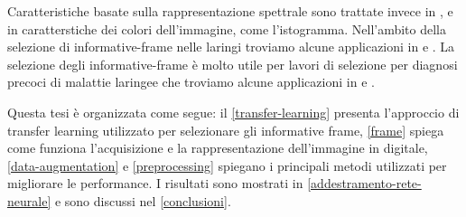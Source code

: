 Caratteristiche basate sulla rappresentazione spettrale sono trattate invece in \citeauthor{atasoy_endoscopic} \cite{atasoy_endoscopic}, \citeauthor{haji_wce} \cite{haji_wce} e in \citeauthor{bashar_endoscopy} \cite{bashar_endoscopy} caratterstiche dei colori dell'immagine, come l'istogramma. Nell'ambito della selezione di informative-frame nelle laringi  troviamo alcune applicazioni in \citeauthor{moccia_workflow} \cite{moccia_workflow} \citeauthor{moccia_larynge_2} \cite{moccia_larynge_2} e \citeauthor{patrini_tl} \cite{patrini_tl}. La selezione degli informative-frame è molto utile per lavori di selezione per diagnosi precoci di malattie laringee che troviamo alcune applicazioni in \citeauthor{moccia_larynge} \cite{moccia_larynge} \citeauthor{turkmen_larynge} \cite{turkmen_larynge} e \citeauthor{narbalata_larynge} \cite{narbalata_larynge}.

Questa tesi è organizzata come segue: il \cref{transfer-learning} presenta l'approccio di transfer learning utilizzato per selezionare gli informative frame, \cref{frame} spiega come funziona l'acquisizione e la rappresentazione dell'immagine in digitale, \cref{data-augmentation}  e  \cref{preprocessing} spiegano i principali metodi utilizzati per migliorare le performance. I risultati sono mostrati in \cref{addestramento-rete-neurale} e sono discussi nel \cref{conclusioni}.